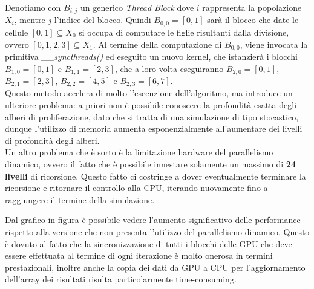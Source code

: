 Denotiamo con $B_{i,j}$ un generico \textit{Thread Block} dove
$i$ rappresenta la popolazione $X_{i}$, mentre $j$ l'indice del blocco.
Quindi $B_{0,0} = [0, 1]$ sarà il blocco che date le
cellule $[0, 1] \subseteq X_{0}$ si occupa di
computare le figlie risultanti dalla divisione, ovvero
$[0, 1, 2, 3] \subseteq X_{1}$.
Al termine della computazione di $B_{0,0}$, viene invocata la primitiva 
\textit{\_\_syncthreads()} ed eseguito un nuovo kernel, che istanzierà
i blocchi $B_{1,0} = [0, 1]$ e $B_{1,1} = [2, 3]$, che a loro volta
eseguiranno $B_{2,0} = [0, 1]$, $B_{2,1} = [2, 3]$,
$B_{2,2} = [4, 5]$ e $B_{2,3} = [6, 7]$.
\\
Questo metodo accelera di molto l'esecuzione dell'algoritmo, ma introduce un
ulteriore problema: a priori non è possibile conoscere la profondità esatta
degli alberi di proliferazione, dato che si tratta di una simulazione
di tipo stocastico, dunque l'utilizzo di memoria aumenta esponenzialmente
all'aumentare dei livelli di profondità degli alberi.
\\
Un altro problema che è sorto è la limitazione hardware del parallelismo
dinamico, ovvero il fatto che è possibile innestare solamente un massimo
di \textbf{24 livelli} di ricorsione. Questo fatto ci costringe a dover
eventualmente terminare la ricorsione e ritornare il controllo alla CPU,
iterando nuovamente fino a raggiungere il termine della simulazione.

\begin{figure}[H]
    \centering
    \caption{}
\end{figure}

Dal grafico in figura è possibile vedere l'aumento significativo delle
performance rispetto alla versione che non presenta l'utilizzo del
parallelismo dinamico. Questo è dovuto al fatto che la sincronizzazione
di tutti i blocchi delle GPU che deve essere effettuata al termine di ogni
iterazione è molto onerosa in termini prestazionali, inoltre anche la copia
dei dati da GPU a CPU per l'aggiornamento dell'array dei risultati risulta
particolarmente time-consuming.

